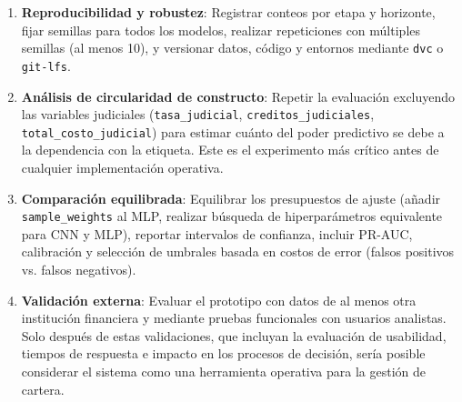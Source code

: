 \begin{enumerate}
    \item \textbf{Reproducibilidad y robustez}: Registrar conteos por etapa y horizonte, fijar semillas para todos los modelos, realizar repeticiones con múltiples semillas (al menos 10), y versionar datos, código y entornos mediante \texttt{dvc} o \texttt{git-lfs}.
    
    \item \textbf{Análisis de circularidad de constructo}: Repetir la evaluación excluyendo las variables judiciales (\texttt{tasa\_judicial}, \texttt{creditos\_judiciales}, \texttt{total\_costo\_judicial}) para estimar cuánto del poder predictivo se debe a la dependencia con la etiqueta. Este es el experimento más crítico antes de cualquier implementación operativa.
    
    \item \textbf{Comparación equilibrada}: Equilibrar los presupuestos de ajuste (añadir \texttt{sample\_weights} al MLP, realizar búsqueda de hiperparámetros equivalente para CNN y MLP), reportar intervalos de confianza, incluir PR-AUC, calibración y selección de umbrales basada en costos de error (falsos positivos vs. falsos negativos).
    
    \item \textbf{Validación externa}: Evaluar el prototipo con datos de al menos otra institución financiera y mediante pruebas funcionales con usuarios analistas. Solo después de estas validaciones, que incluyan la evaluación de usabilidad, tiempos de respuesta e impacto en los procesos de decisión, sería posible considerar el sistema como una herramienta operativa para la gestión de cartera.
    
\end{enumerate}